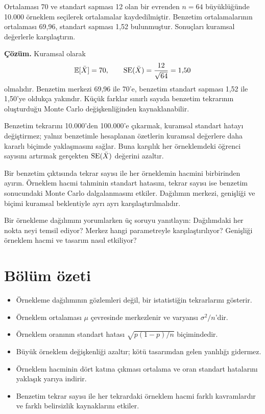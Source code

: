 Ortalaması 70 ve standart sapması 12 olan bir evrenden $n=64$ büyüklüğünde
10.000 örneklem seçilerek ortalamalar kaydedilmiştir. Benzetim ortalamalarının
ortalaması 69,96, standart sapması 1,52 bulunmuştur. Sonuçları kuramsal
değerlerle karşılaştırın.

\textbf{Çözüm.} Kuramsal olarak
\[
\mathbb{E}[\bar X]=70,
\qquad \operatorname{SE}(\bar X)=\frac{12}{\sqrt{64}}=1{,}50
\]
olmalıdır. Benzetim merkezi 69,96 ile 70'e, benzetim standart sapması 1,52
ile 1,50'ye oldukça yakındır. Küçük farklar sınırlı sayıda benzetim tekrarının
oluşturduğu Monte Carlo değişkenliğinden kaynaklanabilir.

Benzetim tekrarını 10.000'den 100.000'e çıkarmak, kuramsal standart hatayı
değiştirmez; yalnız benzetimle hesaplanan özetlerin kuramsal değerlere daha
kararlı biçimde yaklaşmasını sağlar. Buna karşılık her örneklemdeki öğrenci
sayısını artırmak gerçekten $\operatorname{SE}(\bar X)$ değerini azaltır.

\begin{outputguidebox}
Bir benzetim çıktısında tekrar sayısı ile her örneklemin hacmini birbirinden
ayırın. Örneklem hacmi tahminin standart hatasını, tekrar sayısı ise benzetim
sonucundaki Monte Carlo dalgalanmasını etkiler. Dağılımın merkezi, genişliği
ve biçimi kuramsal beklentiyle ayrı ayrı karşılaştırılmalıdır.
\end{outputguidebox}





\begin{etkinlik}
Bir örnekleme dağılımını yorumlarken üç soruyu yanıtlayın: Dağılımdaki her
nokta neyi temsil ediyor? Merkez hangi parametreyle karşılaştırılıyor?
Genişliği örneklem hacmi ve tasarım nasıl etkiliyor?
\end{etkinlik}

\section{Bölüm özeti}

\begin{itemize}
  \item Örnekleme dağılımının gözlemleri değil, bir istatistiğin tekrarlarını gösterir.
  \item Örneklem ortalaması $\mu$ çevresinde merkezlenir ve varyansı $\sigma^2/n$'dir.
  \item Örneklem oranının standart hatası $\sqrt{p(1-p)/n}$ biçimindedir.
  \item Büyük örneklem değişkenliği azaltır; kötü tasarımdan gelen yanlılığı gidermez.
  \item Örneklem hacminin dört katına çıkması ortalama ve oran standart
  hatalarını yaklaşık yarıya indirir.
  \item Benzetim tekrar sayısı ile her tekrardaki örneklem hacmi farklı
  kavramlardır ve farklı belirsizlik kaynaklarını etkiler.
\end{itemize}

